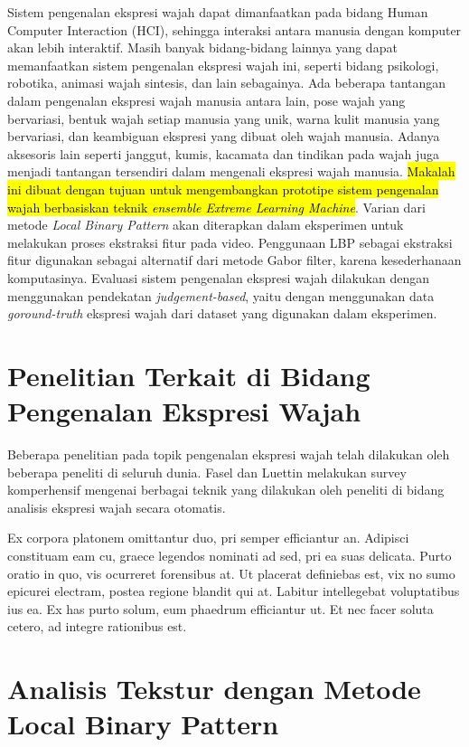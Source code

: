 \documentclass[review,3p,12pt]{elsarticle}
\begin{document}
Sistem pengenalan ekspresi wajah dapat dimanfaatkan pada bidang Human Computer Interaction (HCI), sehingga interaksi antara manusia dengan komputer akan lebih interaktif. Masih banyak bidang-bidang lainnya yang dapat memanfaatkan sistem pengenalan ekspresi wajah ini, seperti bidang psikologi, robotika, animasi wajah sintesis, dan lain sebagainya. Ada beberapa tantangan dalam pengenalan ekspresi wajah manusia antara lain, pose wajah yang bervariasi, bentuk wajah setiap manusia yang unik, warna kulit manusia yang bervariasi, dan keambiguan ekspresi yang dibuat oleh wajah manusia. Adanya aksesoris lain seperti janggut, kumis, kacamata dan tindikan pada wajah juga menjadi tantangan tersendiri dalam mengenali ekspresi wajah manusia. \hl{Makalah ini dibuat dengan tujuan untuk mengembangkan prototipe sistem pengenalan wajah berbasiskan teknik \textit{ensemble Extreme Learning Machine}}. Varian dari metode \textit{Local Binary Pattern} akan diterapkan dalam eksperimen untuk melakukan proses ekstraksi fitur pada video. Penggunaan LBP sebagai ekstraksi fitur digunakan sebagai alternatif dari metode Gabor filter, karena kesederhanaan komputasinya. Evaluasi sistem pengenalan ekspresi wajah dilakukan dengan menggunakan pendekatan \textit{judgement-based}, yaitu dengan menggunakan data \textit{goround-truth} ekspresi wajah dari dataset yang digunakan dalam eksperimen.


\section{Penelitian Terkait di Bidang Pengenalan Ekspresi Wajah}
\label{related}

Beberapa penelitian pada topik pengenalan ekspresi wajah telah dilakukan oleh beberapa peneliti di seluruh dunia. Fasel dan Luettin \cite{fasel2003automatic} melakukan survey komperhensif mengenai berbagai teknik yang dilakukan oleh peneliti di bidang analisis ekspresi wajah secara otomatis.

Ex corpora platonem omittantur duo, pri semper efficiantur an. Adipisci constituam eam cu, graece legendos nominati ad sed, pri ea suas delicata. Purto oratio in quo, vis ocurreret forensibus at. Ut placerat definiebas est, vix no sumo epicurei electram, postea regione blandit qui at. Labitur intellegebat voluptatibus ius ea. Ex has purto solum, eum phaedrum efficiantur ut. Et nec facer soluta cetero, ad integre rationibus est.


\section{Analisis Tekstur dengan Metode Local Binary Pattern}
\label{lbp}
\end{document}
